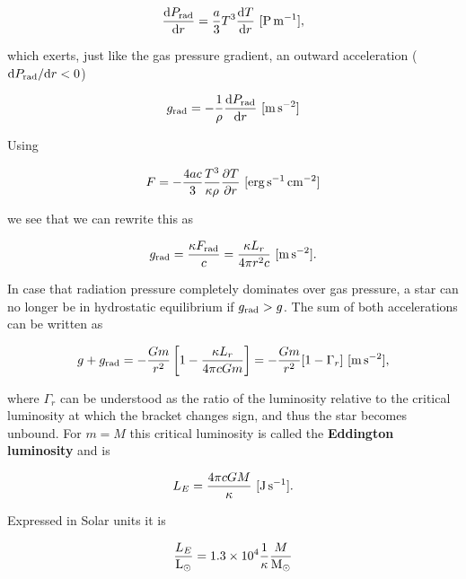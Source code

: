 \documentclass[a4paper,10pt]{article}
\begin{document}
\begin{align*}
    \frac{{\rm d}P_{\rm rad}}{{\rm d}r} = \frac{a}{3}T^3\frac{{\rm d}T}{{\rm d}r} ~ [{\rm P\,m^{-1}}],
\end{align*}

{\noindent}which exerts, just like the gas pressure gradient, an outward acceleration (${\rm d}P_{\rm rad}/{\rm d}r<0$)

\begin{align*}
    g_{\rm rad} = -\frac{1}{\rho} \frac{{\rm d}P_{\rm rad}}{{\rm d}r} ~ [{\rm m\,s^{-2}}]
\end{align*}

{\noindent}Using 

\begin{align*}
    F = -\frac{4ac}{3} \frac{T^3}{\kappa\rho}\frac{\partial T}{\partial r} ~ [{\rm erg\,s^{-1}\,cm^{-2}}]
\end{align*}

we see that we can rewrite this as

\begin{align*}
    g_{\rm rad} = \frac{\kappa F_{\rm rad}}{c} = \frac{\kappa L_r}{4\pi r^2c} ~ [{\rm m\,s^{-2}}].
\end{align*}

{\noindent}In case that radiation pressure completely dominates over gas pressure, a star can no longer be in hydrostatic equilibrium if $g_{\rm rad}>g$. The sum of both accelerations can be written as

\begin{align*}
    g+g_{\rm rad} = -\frac{Gm}{r^2} \left[ 1-\frac{\kappa L_r}{4\pi cGm} \right] = -\frac{Gm}{r^2}[1-\Gamma_r] ~ [{\rm m\,s^{-2}}],
\end{align*}

{\noindent}where $\Gamma_r$ can be understood as the ratio of the luminosity relative to the critical luminosity at which the bracket changes sign, and thus the star becomes unbound. For $m=M$ this critical luminosity is called the \textbf{Eddington luminosity} and is

\begin{align*}
    L_E = \frac{4\pi cGM}{\kappa} ~ [{\rm J\,s^{-1}}].
\end{align*}

{\noindent}Expressed in Solar units it is

\begin{align*}
    \frac{L_E}{{\rm L_\odot}} = 1.3\times10^4\frac{1}{\kappa} \frac{M}{{\rm M_\odot}}
\end{align*}
\end{document}
